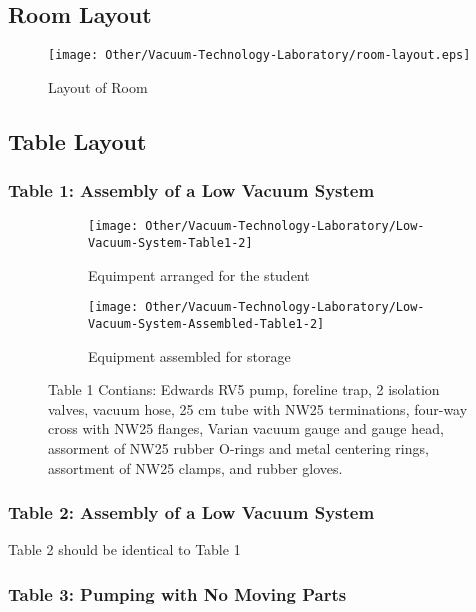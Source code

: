 \documentclass{book}
\begin{document}
\subsection{Room Layout}

\begin{figure}[H]
\texttt{[image: Other/Vacuum-Technology-Laboratory/room-layout.eps]}
\caption{Layout of Room}
\label{Layout of Room}
\end{figure}

\subsection{Table Layout}

\subsubsection{Table 1: Assembly of a Low Vacuum System}

\begin{figure}[H]
\centering
\begin{subfigure}{.5\textwidth} 
  \centering
  \texttt{[image: Other/Vacuum-Technology-Laboratory/Low-Vacuum-System-Table1-2]}
  \caption{Equimpent arranged for the student} 
  \label{For Storage - Assembly of a Low Vacuum System}
\end{subfigure}%
\begin{subfigure}{.5\textwidth}
  \centering
  \texttt{[image: Other/Vacuum-Technology-Laboratory/Low-Vacuum-System-Assembled-Table1-2]}
  \caption{Equipment assembled for storage}
  \label{For Student - Assembly of a Low Vacuum System} 
\end{subfigure}
\caption{Table 1 Contians: Edwards RV5 pump, foreline trap, 2 isolation valves, vacuum hose, 25 cm tube with NW25 terminations, four-way cross with NW25 flanges, Varian vacuum gauge and gauge head, assorment of NW25 rubber O-rings and metal centering rings, assortment of NW25 clamps, and rubber gloves.}
\label{fig:test}
\end{figure}

\subsubsection{Table 2: Assembly of a Low Vacuum System}
Table 2 should be identical to Table 1

\subsubsection{Table 3: Pumping with No Moving Parts}
\end{document}
